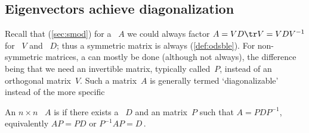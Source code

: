 \subsection{Eigenvectors achieve diagonalization}
\label{sec:ditead}


Recall that (\cref{sec:smod}) for a ~\(A\) we could always factor \(A=VD\tr V=VDV^{-1}\) for ~\(V\) and ~\(D\); thus a symmetric matrix is always  (\cref{def:odsble}).
For non-symmetric matrices, a  can mostly be done  (although not always),
the difference being that we need an invertible matrix, typically called~\(P\), instead of an orthogonal matrix~\(V\).
Such a matrix~\(A\) is generally termed `diagonalizable' instead of the more specific 


\begin{definition} \label{def:diagonalise} 
An \(n\times n\) ~\(A\) is  if there exists a ~\(D\) and an  matrix~\(P\) such that \(A=PDP^{-1}\), equivalently \(AP=PD\) or \(P^{-1}AP=D\)\,.
\end{definition}


